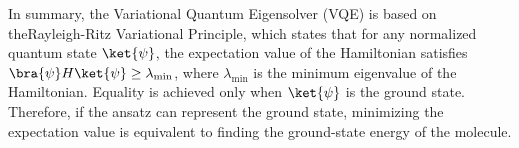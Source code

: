 \highspace
In summary, the Variational Quantum Eigensolver (VQE) is based on the\break Rayleigh-Ritz Variational Principle, which states that for any normalized quantum state $\ket{\psi}$, the expectation value of the Hamiltonian satisfies $\bra{\psi} H \ket{\psi} \ge \lambda_{\min}$, where $\lambda_{\min}$ is the minimum eigenvalue of the Hamiltonian. Equality is achieved only when $\ket{\psi}$ is the ground state. Therefore, if the ansatz can represent the ground state, minimizing the expectation value is equivalent to finding the ground-state energy of the molecule.